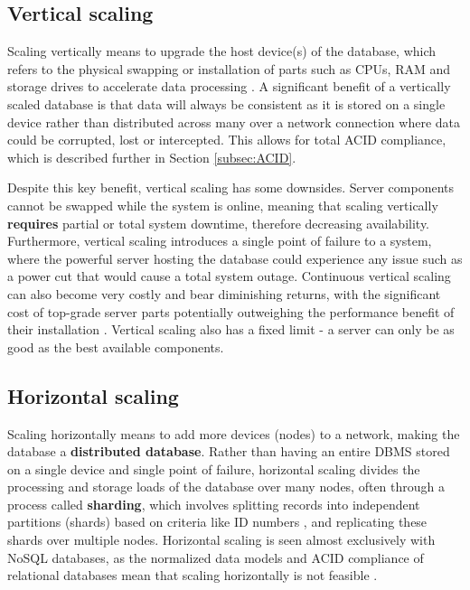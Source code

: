 \subsection{Vertical scaling}
Scaling vertically means to upgrade the host device(s) of the database, which refers to the physical swapping or installation of 
parts such as CPUs, RAM and storage drives to accelerate data processing \autocite{cattellScalableSQLNoSQL2011}. 
A significant benefit of a vertically scaled database is that data will always be consistent as it is stored on a single device rather than
distributed across many over a network connection where data could be corrupted, lost or intercepted. This allows for total ACID compliance,
which is described further in Section \ref{subsec:ACID}. 

\para Despite this key benefit, vertical scaling has some downsides. Server components cannot be swapped while the system is online, meaning 
that scaling vertically \textbf{requires} partial or total system downtime, therefore decreasing availability. Furthermore, vertical scaling 
introduces a single point of failure to a system, where the powerful server hosting the database could experience any issue such as a power cut 
that would cause a total system outage. Continuous vertical scaling can also become very costly and bear diminishing returns, with the 
significant cost of top-grade server parts potentially outweighing the performance benefit of their installation 
\autocite{mongodbGuideHorizontalVs}. Vertical scaling also has a fixed limit - a server can only be as good as the best available components.


\subsection{Horizontal scaling}\label{sec:HorizontalScaling}

Scaling horizontally means to add more devices (nodes) to a network, making the database a \textbf{distributed database}. Rather 
than having an entire DBMS stored on a single device and single point of failure, horizontal scaling divides the processing and storage 
loads of the database over many nodes, often through a process called \textbf{sharding}, which involves splitting records into independent 
partitions (shards) based on criteria like ID numbers \autocite{corbelliniPersistingBigdataNoSQL2017}, and replicating these shards over multiple 
nodes. Horizontal scaling is seen almost exclusively with NoSQL databases, as the normalized data models and ACID compliance of relational 
databases mean that scaling horizontally is not feasible \autocite{hechtNoSQLEvaluationUse2011}. 

